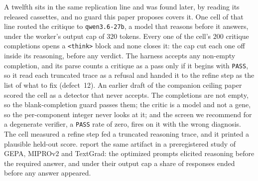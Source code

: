\documentclass[11pt]{article}
\begin{document}
A twelfth sits in the same replication line and was found later, by reading its released
cassettes, and no guard this paper proposes covers it. One cell of that line routed the critique to \texttt{qwen3.6-27b}, a model that reasons
before it answers, under the worker's output cap of $320$ tokens. Every one of the cell's $200$
critique completions opens a \texttt{<think>} block and none closes it: the cap cut each one off
inside its reasoning, before any verdict. The harness accepts any non-empty completion, and its
parse counts a critique as a pass only if it begins with \texttt{PASS}, so it read each truncated
trace as a refusal and handed it to the refine step as the list of what to fix (defect~12). An
earlier draft of the companion ceiling paper scored the cell as a detector that never accepts.
The completions are not empty, so the blank-completion guard passes them; the critic is a model
and not a gene, so the per-component integer never looks at it; and the screen we recommend for a
degenerate verifier, a \texttt{PASS} rate of zero, fires on it with the wrong diagnosis. The cell
measured a refine step fed a truncated reasoning trace, and it printed a plausible held-out score.
\citet{han2026requirements} report the same artifact in a preregistered study of GEPA, MIPROv2 and
TextGrad: the optimized prompts elicited reasoning before the required answer, and under their
output cap a share of responses ended before any answer appeared.
\end{document}

